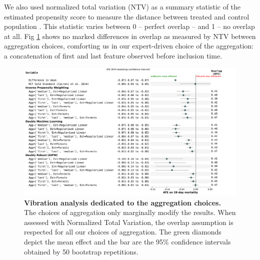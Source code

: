 \documentclass[10pt,letterpaper]{article}
\begin{document}
We also used normalized total variation (NTV) as a summary statistic of the
estimated propensity score to measure the distance between treated and control
population \cite{doutreligne2023select}. This statistic varies between 0 --
perfect overlap -- and 1 -- no overlap at all. Fig
\ref{apd:fig:albumin_for_sepsis:vibration_analysis_for_aggregation} shows no
marked differences in overlap as measured by NTV between aggregation choices,
comforting us in our expert-driven choice of the aggregation: a concatenation
of first and last feature observed before inclusion time.

\begin{figure}[h!]
    \centering
    \includegraphics[width=1.0\linewidth]{img_supp_final/sensitivity_feature_aggregation_albumin_for_sepsis__bs_50.pdf}
    \caption{{\bf Vibration analysis dedicated to the aggregation choices.}\\The
        choices of aggregation only marginally modify the results. When assessed
        with Normalized Total Variation, the overlap assumption is respected for all
        our choices of aggregation. The green diamonds depict the mean effect and
        the bar are the 95\% confidence intervals obtained by 50 bootstrap
        repetitions.}\label{apd:fig:albumin_for_sepsis:vibration_analysis_for_aggregation}
\end{figure}



\end{document}
